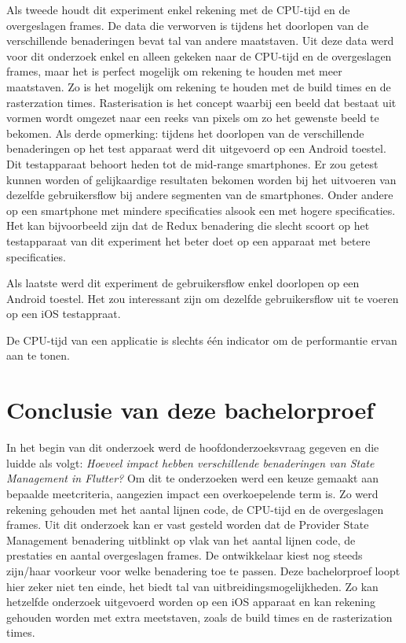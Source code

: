 Als tweede houdt dit experiment enkel rekening met de CPU-tijd en de overgeslagen frames. De data die verworven is tijdens het doorlopen van de verschillende benaderingen bevat tal van andere maatstaven. Uit deze data werd voor dit onderzoek enkel en alleen gekeken naar de CPU-tijd en de overgeslagen frames, maar het is perfect mogelijk om rekening te houden met meer maatstaven. Zo is het mogelijk om rekening te houden met de build times en de rasterzation times. Rasterisation is het concept waarbij een beeld dat bestaat uit vormen wordt omgezet naar een reeks van pixels om zo het gewenste beeld te bekomen. \newline \newline
Als derde opmerking: tijdens het doorlopen van de verschillende benaderingen op het test apparaat werd dit uitgevoerd op een Android toestel. Dit testapparaat behoort heden tot de mid-range smartphones. Er zou getest kunnen worden of gelijkaardige resultaten bekomen worden bij het uitvoeren van dezelfde gebruikersflow bij andere segmenten van de smartphones. Onder andere op een smartphone met mindere specificaties alsook een met hogere specificaties. Het kan bijvoorbeeld zijn dat de Redux benadering die slecht scoort op het testapparaat van dit experiment het beter doet op een apparaat met betere specificaties. 

Als laatste werd dit experiment de gebruikersflow enkel doorlopen op een Android toestel. Het zou interessant zijn om dezelfde gebruikersflow uit te voeren op een iOS testappraat. 

De CPU-tijd van een applicatie is slechts één indicator om de performantie ervan aan te tonen.

\section{Conclusie van deze bachelorproef}
In het begin van dit onderzoek werd de hoofdonderzoeksvraag gegeven en die luidde als volgt: \textit{Hoeveel impact hebben verschillende benaderingen van State Management in Flutter?} Om dit te onderzoeken werd een keuze gemaakt aan bepaalde meetcriteria, aangezien impact een overkoepelende term is. Zo werd rekening gehouden met het aantal lijnen code, de CPU-tijd en de overgeslagen frames. \newline \newline
Uit dit onderzoek  kan er vast gesteld worden dat de Provider State Management benadering uitblinkt op vlak van het aantal lijnen code, de prestaties en aantal overgeslagen frames. \newline
De ontwikkelaar kiest nog steeds zijn/haar voorkeur voor welke benadering toe te passen. \newline \newline
Deze bachelorproef loopt hier zeker niet ten einde, het biedt tal van uitbreidingsmogelijkheden. Zo kan hetzelfde onderzoek uitgevoerd worden op een iOS apparaat en kan rekening gehouden worden met extra meetstaven, zoals de build times en de rasterization times.